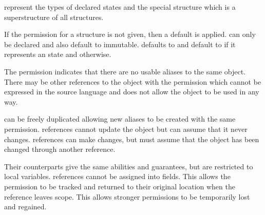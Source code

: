  represent the types of declared states
and the special  structure which is a superstructure
of all structures.

If the permission for a structure is not given, then a default is applied.
 can only be declared 
and also default to immutable.   defaults to 
and  default to  if it
represents an  state and  otherwise. 

The  permission indicates that there are no
usable aliases to the same object.  There may be other
references to the object with the  permission
which cannot be expressed in the source language and
does not allow the object to be used in any way.

 can be freely duplicated
allowing new aliases to be created with the same permission.
 references cannot update the object
but can assume that it never changes.  references
can make changes, but must assume that the object has been
changed through another reference.

Their  counterparts give the same abilities
and guarantees, but are restricted to local variables.  
 references cannot be assigned into fields.
This allows the permission to be tracked and returned to their
original location when the reference leaves scope.  This allows
stronger permissions to be temporarily lost and regained.

